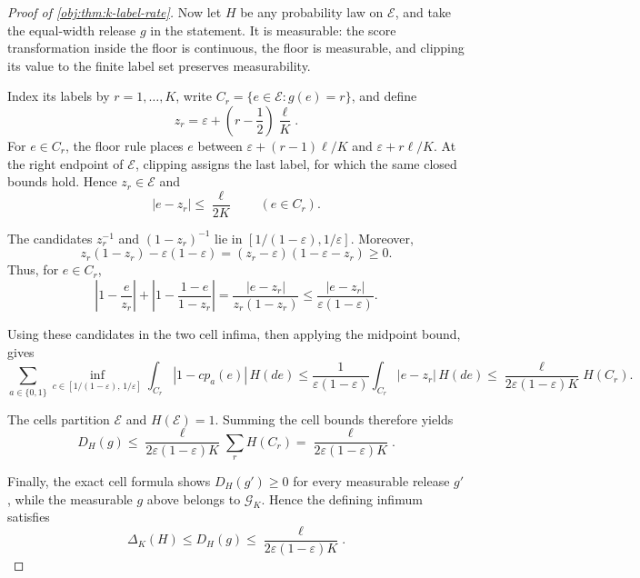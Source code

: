 \documentclass[11pt]{article}
\begin{document}
\begin{proof}[Proof of \cref{obj:thm:k-label-rate}]
Now let \(H\) be any probability law on \(\mathcal E\), and take the equal-width release \(g\) in the statement. It is measurable: the score transformation inside the floor is continuous, the floor is measurable, and clipping its value to the finite label set preserves measurability. %

Index its labels by \(r=1,\ldots,K\), write \(C_r=\{e\in\mathcal E:g(e)=r\}\), and define
\[
z_r=\varepsilon+\left(r-\frac12\right)\frac{\ell}{K}.
\]
For \(e\in C_r\), the floor rule places \(e\) between \(\varepsilon+(r-1)\ell/K\) and \(\varepsilon+r\ell/K\). At the right endpoint of \(\mathcal E\), clipping assigns the last label, for which the same closed bounds hold. Hence \(z_r\in\mathcal E\) and
\[
|e-z_r|\leq\frac{\ell}{2K}\qquad(e\in C_r).
\] %

The candidates \(z_r^{-1}\) and \((1-z_r)^{-1}\) lie in \([1/(1-\varepsilon),1/\varepsilon]\). Moreover,
\[
z_r(1-z_r)-\varepsilon(1-\varepsilon)
=(z_r-\varepsilon)(1-\varepsilon-z_r)\geq0.
\]
Thus, for \(e\in C_r\),
\[
\left|1-\frac e{z_r}\right|
+\left|1-\frac{1-e}{1-z_r}\right|
=\frac{|e-z_r|}{z_r(1-z_r)}
\leq \frac{|e-z_r|}{\varepsilon(1-\varepsilon)}.
\] %

Using these candidates in the two cell infima, then applying the midpoint bound, gives
\[
\sum_{a\in\{0,1\}}
\inf_{c\in[1/(1-\varepsilon),\,1/\varepsilon]}
\int_{C_r}|1-cp_a(e)|\,H(de)
\leq
\frac{1}{\varepsilon(1-\varepsilon)}
\int_{C_r}|e-z_r|\,H(de)
\leq
\frac{\ell}{2\varepsilon(1-\varepsilon)K}H(C_r).
\] %

The cells partition \(\mathcal E\) and \(H(\mathcal E)=1\). Summing the cell bounds therefore yields
\[
D_H(g)\leq
\frac{\ell}{2\varepsilon(1-\varepsilon)K}
\sum_r H(C_r)
=
\frac{\ell}{2\varepsilon(1-\varepsilon)K}.
\] %

Finally, the exact cell formula shows \(D_H(g')\geq0\) for every measurable release \(g'\), while the measurable \(g\) above belongs to \(\mathcal G_K\). Hence the defining infimum satisfies
\[
\Delta_K(H)\leq D_H(g)
\leq\frac{\ell}{2\varepsilon(1-\varepsilon)K}.
\] %
\end{proof}
\end{document}
